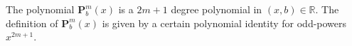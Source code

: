 The polynomial $\mathbf{P}^m_b(x)$ is a $2m+1$ degree polynomial in $(x,b) \in \mathbb{R}$.
The definition of $\mathbf{P}^m_b(x)$ is given by a certain polynomial identity for odd-powers $x^{2m+1}$.
